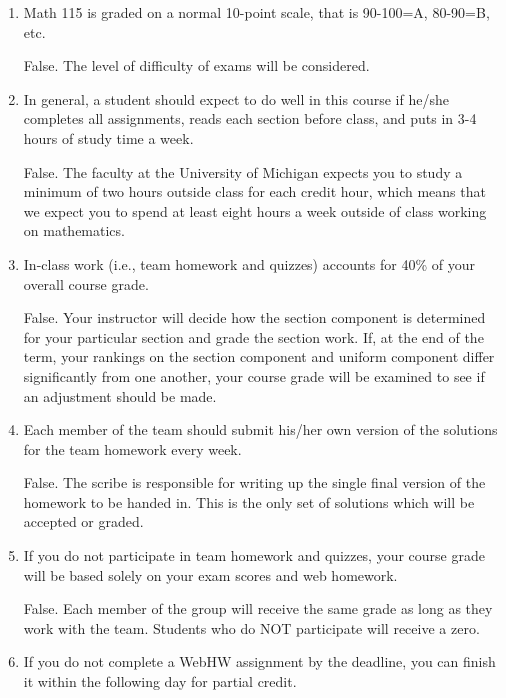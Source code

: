 \documentclass[11pt,letterpaper]{article}
\begin{document}
\begin{enumerate}
\item  Math 115 is graded on a normal 10-point scale, that is 90-100=A, 80-90=B, etc.  

\vspace{.5pc}
False.  The level of difficulty of exams will be considered.

\item  In general, a student should expect to do well in this course if he/she completes all assignments, reads each section before class, and puts in 3-4 hours of study time a week.

\vspace{.5pc}
False.  The faculty at the University of Michigan expects you to study a minimum of two hours outside class for each credit hour, which means that we expect you to spend at least eight hours a week outside of class working on mathematics.

\item In-class work (i.e., team homework and quizzes) accounts for 40\% of your overall course grade.

\vspace{.5pc}
False.  Your instructor will decide how the section component is determined for your particular section and grade the section work.  If, at the end of the term, your rankings on the section component and uniform component differ significantly from one another, your course grade will be examined to see if an adjustment should be made.

\item Each member of the team should submit his/her own version of the solutions for the team homework every week.

\vspace{.5pc}
False.  The scribe is responsible for writing up the single final version of the homework to be handed in.  This is the only set of solutions which will be accepted or graded.

\item If you do not participate in team homework and quizzes, your course grade will be based solely on your exam scores and web homework.

\vspace{.5pc}
False.  Each member of the group will receive the same grade as long as they work with the team.  Students who do NOT participate will receive a zero.

\item If you do not complete a WebHW assignment by the deadline, you can finish it within the following day for partial credit.


\end{enumerate}
\end{document}
